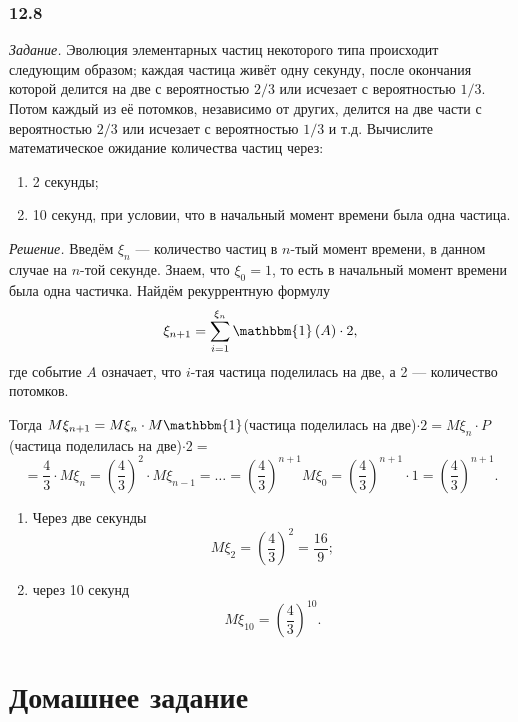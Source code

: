 \subsubsection*{12.8}

\textit{Задание.}
Эволюция элементарных частиц некоторого типа происходит следующим образом;
каждая частица живёт одну секунду, после окончания которой делится на две с вероятностью $2/3$ или исчезает с вероятностью $1/3$.
Потом каждый из её потомков, независимо от других, делится на две части с вероятностью $2/3$ или исчезает с вероятностью $1/3$ и т.д.
Вычислите математическое ожидание количества частиц через:
\begin{enumerate}[label=\alph*)]
\item 2 секунды;
\item 10 секунд, при условии, что в начальный момент времени была одна частица.
\end{enumerate}

\textit{Решение.} Введём $ \xi_n$ --- количество частиц в $n$-тый момент времени, в данном случае на $n$-той секунде.
Знаем, что $ \xi_0 = 1$, то есть в начальный момент времени была одна частичка.
Найдём рекуррентную формулу
$$ \xi_{n+1} = \sum \limits_{i=1}^{ \xi_n} \mathbbm{1} \left( A \right) \cdot 2,$$
где событие $A$ означает, что $i$-тая частица поделилась на две, а 2 --- количество потомков.

Тогда $M \xi_{n+1} = M \xi_n \cdot M \mathbbm{1}$(частица поделилась на две)$ \cdot 2 = M \xi_n \cdot P$(частица поделилась на две)$ \cdot 2 =$
$$= \frac{4}{3} \cdot M \xi_n =
\left( \frac{4}{3} \right)^2 \cdot M \xi_{n-1} =
\dotsc =
\left( \frac{4}{3} \right)^{n+1} M \xi_0 =
\left( \frac{4}{3} \right)^{n+1} \cdot 1 =
\left( \frac{4}{3} \right)^{n+1}.$$

\begin{enumerate}[label=\alph*)]
\item Через две секунды
$$M \xi_2 =
\left( \frac{4}{3} \right)^2 =
\frac{16}{9};$$
\item через 10 секунд
$$M \xi_{10} =
\left( \frac{4}{3} \right)^{10}.$$
\end{enumerate}

\section*{Домашнее задание}
